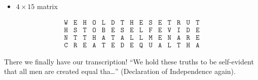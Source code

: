 {\begin{enumerate}
\begin{itemize}
\begin{center}
\[\begin{array}{cccccccccccccccccccc}
                                    \texttt{H} & \texttt{E} & \texttt{R} & \texttt{T} & \texttt{O} & \texttt{L} & \texttt{T} & \texttt{T} & \texttt{S} & \texttt{H} & \texttt{E} & \texttt{L} & \texttt{F} & \texttt{E} & \texttt{A} & \texttt{N} & \texttt{I} & \texttt{U} & \texttt{H} & \texttt{E} \\

                                    \texttt{N} & \texttt{S} & \texttt{H} & \texttt{E} & \texttt{H} & \texttt{B} & \texttt{D} & \texttt{E} & \texttt{A} & \texttt{E} & \texttt{E} & \texttt{Q} & \texttt{M} & \texttt{E} & \texttt{T} & \texttt{L} & \texttt{A} & \texttt{D} & \texttt{T} & \texttt{A}
                                \end{array}
                            \]
                            \vspace*{-1cm}
                        \end{center}
                        There are no words here.
                  \item \(4 \times 15\) matrix
              \end{itemize}
              \begin{center}
                  \vspace*{-1cm}
                  \[
                      \begin{array}{ccccccccccccccc}
                          \texttt{W} & \texttt{E} & \texttt{H} & \texttt{O} & \texttt{L} & \texttt{D} & \texttt{T} & \texttt{H} & \texttt{E} & \texttt{S} & \texttt{E} & \texttt{T} & \texttt{R} & \texttt{U} & \texttt{T} \\

                          \texttt{H} & \texttt{S} & \texttt{T} & \texttt{O} & \texttt{B} & \texttt{E} & \texttt{S} & \texttt{E} & \texttt{L} & \texttt{F} & \texttt{E} & \texttt{V} & \texttt{I} & \texttt{D} & \texttt{E} \\

                          \texttt{N} & \texttt{T} & \texttt{T} & \texttt{H} & \texttt{A} & \texttt{T} & \texttt{A} & \texttt{L} & \texttt{L} & \texttt{M} & \texttt{E} & \texttt{N} & \texttt{A} & \texttt{R} & \texttt{E} \\

                          \texttt{C} & \texttt{R} & \texttt{E} & \texttt{A} & \texttt{T} & \texttt{E} & \texttt{D} & \texttt{E} & \texttt{Q} & \texttt{U} & \texttt{A} & \texttt{L} & \texttt{T} & \texttt{H} & \texttt{A}
                      \end{array}
                  \]
                  \vspace*{-1cm}
              \end{center}
              There we finally have our transcription! ``We hold these truths to be self-evident that all men are created equal tha\ldots'' (Declaration of Independence again).
    \end{enumerate}
}

